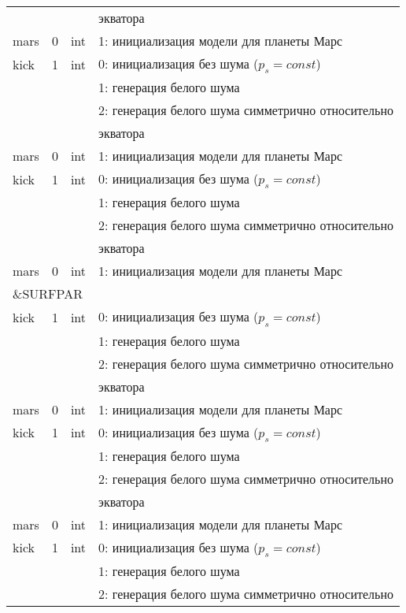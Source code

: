 \begin{longtable}[c]{|l|c|l|l|}
      & & & экватора    \\
     mars & 0 & int & 1: инициализация модели для планеты Марс     \\
    kick & 1 & int & 0: инициализация без шума ($p_s = const$) \\
          &   &     & 1: генерация белого шума                  \\
          &   &     & 2: генерация белого шума симметрично относительно \\
      & & & экватора    \\
     mars & 0 & int & 1: инициализация модели для планеты Марс     \\
    kick & 1 & int & 0: инициализация без шума ($p_s = const$) \\
          &   &     & 1: генерация белого шума                  \\
          &   &     & 2: генерация белого шума симметрично относительно \\
      & & & экватора    \\
     mars & 0 & int & 1: инициализация модели для планеты Марс     \\
     \hline
     \multicolumn{4}{|l|}{\&SURFPAR}        \\ \hline
    kick & 1 & int & 0: инициализация без шума ($p_s = const$) \\
          &   &     & 1: генерация белого шума                  \\
          &   &     & 2: генерация белого шума симметрично относительно \\
      & & & экватора    \\
     mars & 0 & int & 1: инициализация модели для планеты Марс     \\
    kick & 1 & int & 0: инициализация без шума ($p_s = const$) \\
          &   &     & 1: генерация белого шума                  \\
          &   &     & 2: генерация белого шума симметрично относительно \\
      & & & экватора    \\
     mars & 0 & int & 1: инициализация модели для планеты Марс     \\
    kick & 1 & int & 0: инициализация без шума ($p_s = const$) \\
          &   &     & 1: генерация белого шума                  \\
          &   &     & 2: генерация белого шума симметрично относительно \\

\end{longtable}
